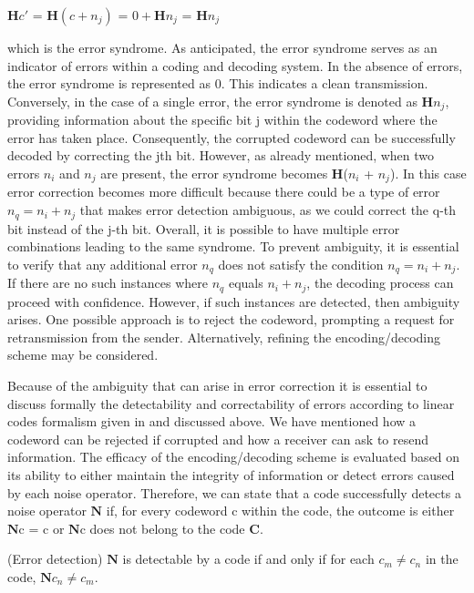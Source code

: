 \documentclass{Configuration_Files/PoliMi3i_thesis}
\begin{document}
\begin{center}
	$\textbf{H}c'$ = $\textbf{H} ( c + {n}_j )$ = $0 + \textbf{H} n_j $  = $\textbf{H}n_j $ 
\end{center}

which is the error syndrome. As anticipated, the error syndrome serves as an indicator of errors within a coding and decoding system. In the absence of errors, the error syndrome is represented as 0. This indicates a clean transmission. Conversely, in the case of a single error, the error syndrome is denoted as {\bf H}$n_j$, providing information about the specific bit j within the codeword where the error has taken place. Consequently, the corrupted codeword can be successfully decoded by correcting the jth bit. However, as already mentioned, when two errors $n_i$ and $n_j$ are present, the error syndrome becomes {\bf H}($n_i$ + $n_j$). In this case error correction becomes more difficult because there could be a type of error $n_q = n_i + n_j$ that makes error detection ambiguous, as we could correct the q-th bit instead of the j-th bit. Overall, it is possible to have multiple error combinations leading to the same syndrome. To prevent ambiguity, it is essential to verify that any additional error $n_q$ does not satisfy the condition $n_q = n_i + n_j$. If there are no such instances where $n_q$ equals $ n_i + n_j$, the decoding process can proceed with confidence. However, if such instances are detected, then ambiguity arises. One possible approach is to reject the codeword, prompting a request for retransmission from the sender. Alternatively, refining the encoding/decoding scheme may be considered. \newline

Because of the ambiguity that can arise in error correction it is essential to discuss formally the detectability and correctability of errors according to linear codes formalism given in \cite{Cha06} and discussed above.
We have mentioned how a codeword can be rejected if corrupted and how a receiver can ask to resend information. The efficacy of the encoding/decoding scheme is evaluated based on its ability to either maintain the integrity of information or detect errors caused by each noise operator. Therefore, we can state that a code successfully detects a noise operator $\textbf{N}$ if, for every codeword c within the code, the outcome is either $\textbf{N}$c = c or $\textbf{N}$c does not belong to the code $\textbf{C}$.

\begin{theorem}(Error detection)
	$\textbf{N}$ is detectable by a code if and only if for each $c_m \neq c_n$ in the code, $\textbf{N}c_n \neq c_m $.
\end{theorem} 
\end{document}
